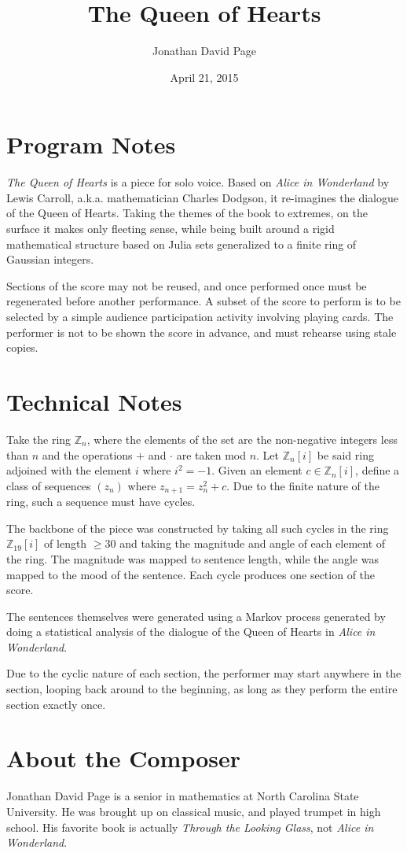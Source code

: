 \documentclass[12pt,letter]{article}
\title{The Queen of Hearts}
\author{Jonathan David Page}
\date{April 21, 2015}
\begin{document}
\maketitle

\section{Program Notes}

\emph{The Queen of Hearts} is a piece for solo voice. Based on \emph{Alice in Wonderland} by Lewis Carroll, a.k.a. mathematician Charles Dodgson, it re-imagines the dialogue of the Queen of Hearts. Taking the themes of the book to extremes, on the surface it makes only fleeting sense, while being built around a rigid mathematical structure based on Julia sets generalized to a finite ring of Gaussian integers.

Sections of the score may not be reused, and once performed once must be regenerated before another performance. A subset of the score to perform is to be selected by a simple audience participation activity involving playing cards. The performer is not to be shown the score in advance, and must rehearse using stale copies.

\section{Technical Notes}

Take the ring $\mathbb{Z}_n$, where the elements of the set are the non-negative integers less than $n$ and the operations $+$ and $\cdot$ are taken mod $n$. Let $\mathbb{Z}_n[i]$ be said ring adjoined with the element $i$ where $i^2 = -1$. Given an element $c \in \mathbb{Z}_n[i]$, define a class of sequences $(z_n)$ where $z_{n+1} = z_n^2 + c$. Due to the finite nature of the ring, such a sequence must have cycles.

The backbone of the piece was constructed by taking all such cycles in the ring $\mathbb{Z}_{19}[i]$ of length $\ge 30$ and taking the magnitude and angle of each element of the ring. The magnitude was mapped to sentence length, while the angle was mapped to the mood of the sentence. Each cycle produces one section of the score.

The sentences themselves were generated using a Markov process generated by doing a statistical analysis of the dialogue of the Queen of Hearts in \emph{Alice in Wonderland}.

Due to the cyclic nature of each section, the performer may start anywhere in the section, looping back around to the beginning, as long as they perform the entire section exactly once.

\section{About the Composer}

Jonathan David Page is a senior in mathematics at North Carolina State University. He was brought up on classical music, and played trumpet in high school. His favorite book is actually \emph{Through the Looking Glass}, not \emph{Alice in Wonderland}. 
\end{document}
